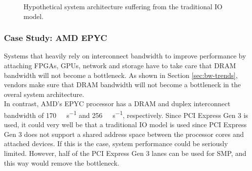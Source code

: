 \begin{figure}[htb!]
  {\caption{Hypothetical system architecture suffering from the traditional IO model.}\label{fig:2-system}}
\end{figure}





\subsubsection{Case Study: AMD EPYC}
Systems that heavily rely on interconnect bandwidth to improve performance by attaching FPGAs, GPUs, network and storage have to take care that DRAM bandwidth will not become a bottleneck. As shown in Section \ref{sec:bw-trends}, vendors make sure that DRAM bandwidth will not become a bottleneck in the overal system architecture.\\
In contrast, AMD's EPYC processor has a DRAM and duplex interconnect bandwidth of \SI{170}{\giga\byte\per\second} and \SI{256}{\giga\byte\per\second}, respectively. Since PCI Express Gen 3 is used, it could very well be that a traditional IO model is used since PCI Express Gen 3 does not support a shared address space between the processor cores and attached devices. If this is the case, system performance could be seriously limited. However, half of the PCI Express Gen 3 lanes can be used for SMP, and this way would remove the bottleneck.






